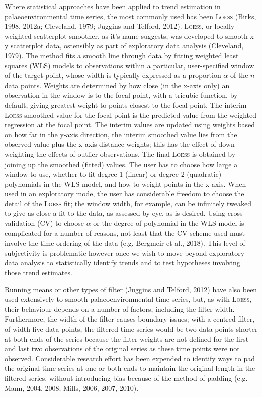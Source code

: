 \documentclass[12pt,]{article}
\newcommand{\loess}{\textsc{Loess}}
\begin{document}
Where statistical approaches have been applied to trend estimation in
palaeoenvironmental time series, the most commonly used has been
\loess{} (Birks, 1998, 2012a; Cleveland, 1979; Juggins and Telford,
2012). \loess{}, or locally weighted scatterplot smoother, as it's name
suggests, was developed to smooth x-y scatterplot data, ostensibly as
part of exploratory data analysis (Cleveland, 1979). The method fits a
smooth line through data by fitting weighted least squares (WLS) models
to observations within a particular, user-specified window of the target
point, whose width is typically expressed as a proportion \(\alpha\) of
the \(n\) data points. Weights are determined by how close (in the
x-axis only) an observation in the window is to the focal point, with a
tricubic function, by default, giving greatest weight to points closest
to the focal point. The interim \loess{}-smoothed value for the focal
point is the predicted value from the weighted regression at the focal
point. The interim values are updated using weights based on how far in
the y-axis direction, the interim smoothed value lies from the observed
value plus the x-axis distance weights; this has the effect of
down-weighting the effects of outlier observations. The final \loess{}
is obtained by joining up the smoothed (fitted) values. The user has to
choose how large a window to use, whether to fit degree 1 (linear) or
degree 2 (quadratic) polynomials in the WLS model, and how to weight
points in the x-axis. When used in an exploratory mode, the user has
considerable freedom to choose the detail of the \loess{} fit; the
window width, for example, can be infinitely tweaked to give as close a
fit to the data, as assessed by eye, as is desired. Using
cross-validation (CV) to choose \(\alpha\) or the degree of polynomial
in the WLS model is complicated for a number of reasons, not least that
the CV scheme used must involve the time ordering of the data (e.g.
Bergmeir et al., 2018). This level of subjectivity is problematic
however once we wish to move beyond exploratory data analysis to
statistically identify trends and to test hypotheses involving those
trend estimates.

Running means or other types of filter (Juggins and Telford, 2012) have
also been used extensively to smooth palaeoenvironmental time series,
but, as with \loess{}, their behaviour depends on a number of factors,
including the filter width. Furthermore, the width of the filter causes
boundary issues; with a centred filter, of width five data points, the
filtered time series would be two data points shorter at both ends of
the series because the filter weights are not defined for the first and
last two observations of the original series as these time points were
not observed. Considerable research effort has been expended to identify
ways to pad the original time series at one or both ends to maintain the
original length in the filtered series, without introducing bias because
of the method of padding (e.g. Mann, 2004, 2008; Mills, 2006, 2007,
2010).
\end{document}
